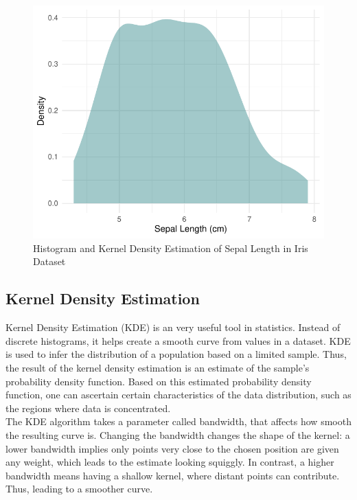 \documentclass{article}\usepackage[]{graphicx}\usepackage[]{xcolor}
\newenvironment{knitrout}{}{} %
\numberwithin{equation}{section}
\begin{document}
\begin{figure}[htbp]
\begin{minipage}[b]{0.48\linewidth}
\begin{knitrout}
{\centering \includegraphics[width=\linewidth]{figure/beamer-kde3-1} 

}


\end{knitrout}
  \end{minipage}
  \caption{Histogram and Kernel Density Estimation of Sepal Length in Iris Dataset}
  \label{fig:iris-plots}
\end{figure}

\subsection{Kernel Density Estimation}

Kernel Density Estimation (KDE) is an very useful tool in statistics. Instead of discrete histograms, it helps create a smooth curve from values in a dataset. KDE is used to infer the distribution of a population based on a limited sample. Thus, the result of the kernel density estimation is an estimate of the sample's probability density function. Based on this estimated probability density function, one can ascertain certain characteristics of the data distribution, such as the regions where data is concentrated.\\

\noindent
The KDE algorithm takes a parameter called bandwidth, that affects how smooth the resulting curve is. Changing the bandwidth changes the shape of the kernel: a lower bandwidth implies only points very close to the chosen position are given any weight, which leads to the estimate looking squiggly. In contrast, a higher bandwidth means having a shallow kernel, where distant points can contribute. Thus, leading to a smoother curve. %
\\
\end{document}
